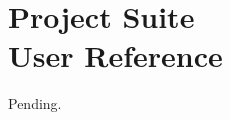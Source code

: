 \documentclass[oneside,11pt]{memoir}
\numberwithin{equation}{section}
\newcommand{\bu}[1]{\textbf{\underline{#1}}}
\begin{document}
\pagebreak
\chapter{Project Suite \\User Reference} \label{reference}
Pending.

%
%
%
%
%
%
\end{document}
